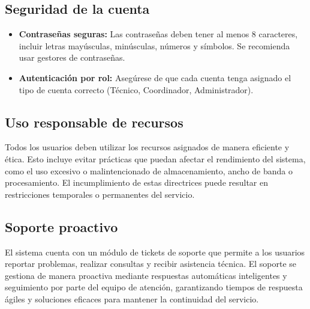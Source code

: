 \subsection{Seguridad de la cuenta}


\begin{itemize}
    \item \textbf{Contraseñas seguras:}  Las contraseñas deben tener al menos 8 caracteres, incluir letras mayúsculas, minúsculas, números y símbolos. Se recomienda usar gestores de contraseñas.
\end{itemize}

\begin{itemize}
    \item \textbf{Autenticación por rol:} Asegúrese de que cada cuenta tenga asignado el tipo de cuenta correcto (Técnico, Coordinador, Administrador).
\end{itemize}


\subsection{Uso responsable de recursos}

Todos los usuarios deben utilizar los recursos asignados de manera eficiente y ética. Esto incluye evitar prácticas que puedan afectar el rendimiento del sistema, como el uso excesivo o malintencionado de almacenamiento, ancho de banda o procesamiento. El incumplimiento de estas directrices puede resultar en restricciones temporales o permanentes del servicio.

\subsection{Soporte proactivo}
El sistema cuenta con un módulo de tickets de soporte que permite a los usuarios reportar problemas, realizar consultas y recibir asistencia técnica. El soporte se gestiona de manera proactiva mediante respuestas automáticas inteligentes y seguimiento por parte del equipo de atención, garantizando tiempos de respuesta ágiles y soluciones eficaces para mantener la continuidad del servicio.

